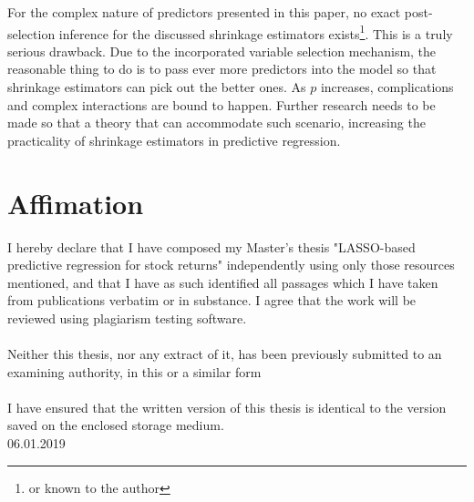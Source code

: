 \documentclass[12pt,a4paper]{article}
\begin{document}
For the complex nature of predictors presented in this paper, no exact post-selection inference for the discussed shrinkage estimators exists\footnote{or known to the author}. This is a truly serious drawback. Due to the incorporated variable selection mechanism, the reasonable thing to do is to pass ever more predictors into the model so that shrinkage estimators can pick out the better ones. As $ p $ increases, complications and complex interactions are bound to happen. Further research needs to be made so that a theory that can accommodate such scenario, increasing the practicality of shrinkage estimators in predictive regression.




\newpage
\section*{Affimation}

I hereby declare that I have composed my Master's thesis "LASSO-based predictive regression for stock returns" independently using only those resources mentioned, and that I have as such identified all passages which I have taken from publications verbatim or in substance. I agree that the work will be reviewed using plagiarism testing software.
\\~\\
Neither this thesis, nor any extract of it, has been previously submitted to an examining authority, in this or a similar form
\\~\\
I have ensured that the written version of this thesis is identical to the version saved on the enclosed storage medium.
\\[2in]
06.01.2019
\end{document}
